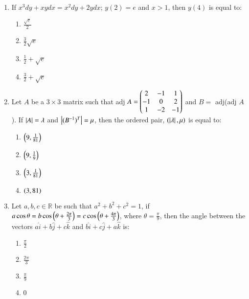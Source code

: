 \documentclass[journal,9pt,twocolumn]{IEEEtran}
\begin{document}
\begin{enumerate}
    \item  If $x^3dy + xydx = x^2dy + 2ydx$; $y(2) = e$ and $x > 1$, then $y(4)$ is equal to:
        
        \begin{multicols}{4}
\begin{enumerate}
    \item $\frac{\sqrt{e}}{2}$
    \item $\frac{3}{2} \sqrt{e}$
    \item $\frac{1}{2} + \sqrt{e}$
    \item $\frac{3}{2} + \sqrt{e}$
\end{enumerate}
\end{multicols}

\item Let $A$ be a $3 \times 3$ matrix such that adj $A = \begin{pmatrix}2 &-1& 1\\-1& 0& 2\\1& -2& -1\end{pmatrix}$ 
and $B =$ adj(adj $ A$). If $\left\vert A\right\vert = \lambda$ and $\left\vert(B^{-1})^T\right\vert = \mu$, then the ordered pair, $(\left\vert\lambda\right\vert, \mu)$ is equal to:

        \begin{multicols}{2}

\begin{enumerate}
    \item $\left(9, \frac{1}{81}\right)$
    \item $\left(9, \frac{1}{9}\right)$
    \item $\left(3, \frac{1}{81}\right)$
    \item $\left(3, 81\right)$
\end{enumerate}
\end{multicols}

\item Let $a, b, c \in \mathbb{R}$ be such that $a^2 + b^2 + c^2 = 1$, if $a \cos \theta = b \cos\left(\theta + \frac{2\pi}{3}\right) = c \cos\left(\theta + \frac{4\pi}{3}\right)$, where $\theta = \frac{\pi}{9}$, then the angle between the vectors $a\hat{i} + b\hat{j} + c\hat{k}$ and $b\hat{i} + c\hat{j}+ a\hat{k} $ is:
        \begin{multicols}{4}

\begin{enumerate}
    \item $\frac{\pi}{2}$
    \item $\frac{2\pi}{3}$
    \item $\frac{\pi}{9}$
    \item $0$
\end{enumerate}
\end{multicols}


\end{enumerate}
\end{document}
